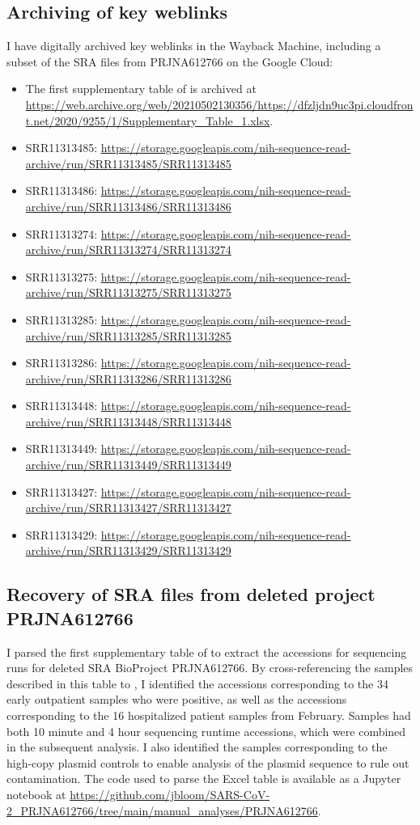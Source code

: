 \documentclass[9pt,twocolumn,twoside]{gsajnl_modified}
\begin{document}
{\subsection{Archiving of key weblinks}
I have digitally archived key weblinks in the Wayback Machine, including a subset of the SRA files from PRJNA612766 on the Google Cloud:
\begin{itemize}
\item The first supplementary table of \citet{farkas2020insights} is archived at \url{https://web.archive.org/web/20210502130356/https://dfzljdn9uc3pi.cloudfront.net/2020/9255/1/Supplementary_Table_1.xlsx}. 
\item SRR11313485: \url{https://storage.googleapis.com/nih-sequence-read-archive/run/SRR11313485/SRR11313485}
\item SRR11313486: \url{https://storage.googleapis.com/nih-sequence-read-archive/run/SRR11313486/SRR11313486}
\item SRR11313274: \url{https://storage.googleapis.com/nih-sequence-read-archive/run/SRR11313274/SRR11313274}
\item SRR11313275: \url{https://storage.googleapis.com/nih-sequence-read-archive/run/SRR11313275/SRR11313275}
\item SRR11313285: \url{https://storage.googleapis.com/nih-sequence-read-archive/run/SRR11313285/SRR11313285}
\item SRR11313286: \url{https://storage.googleapis.com/nih-sequence-read-archive/run/SRR11313286/SRR11313286}
\item SRR11313448: \url{https://storage.googleapis.com/nih-sequence-read-archive/run/SRR11313448/SRR11313448}
\item SRR11313449: \url{https://storage.googleapis.com/nih-sequence-read-archive/run/SRR11313449/SRR11313449}
\item SRR11313427: \url{https://storage.googleapis.com/nih-sequence-read-archive/run/SRR11313427/SRR11313427}
\item SRR11313429: \url{https://storage.googleapis.com/nih-sequence-read-archive/run/SRR11313429/SRR11313429}
\end{itemize}

\subsection{Recovery of SRA files from deleted project PRJNA612766}
I parsed the first supplementary table of \citet{farkas2020insights} to extract the accessions for sequencing runs for deleted SRA BioProject PRJNA612766.
By cross-referencing the samples described in this table to \citet{wang2020medRxiv, wang2020small}, I identified the accessions corresponding to the 34 early outpatient samples who were positive, as well as the accessions corresponding to the 16 hospitalized patient samples from February.
Samples had both 10 minute and 4 hour sequencing runtime accessions, which were combined in the subsequent analysis.
I also identified the samples corresponding to the high-copy plasmid controls to enable analysis of the plasmid sequence to rule out contamination.
The code used to parse the Excel table is available as a Jupyter notebook at \url{https://github.com/jbloom/SARS-CoV-2_PRJNA612766/tree/main/manual_analyses/PRJNA612766}.

}
\end{document}
